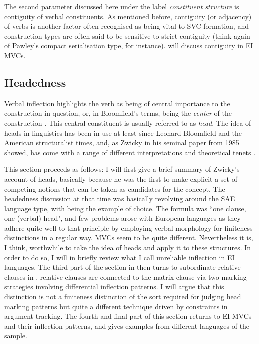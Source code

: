 The second parameter discussed here under the label \textit{constituent structure} is contiguity of verbal constituents. As mentioned before, contiguity (or adjacency) of verbs is another factor often recognised as being vital to SVC formation, and construction types are often said to be sensitive to strict contiguity (think again of Pawley's compact serialisation type, for instance).  will discuss contiguity in EI MVCs.

\subsection{Headedness}\label{sec:headedness}

Verbal inflection highlights the verb as being of central importance to the construction in question, or, in Bloomfield's terms, being the \textit{center} of the construction \citep{bloomfield1933language}. This central constituent is usually referred to as \textit{head}. The idea of heads in linguistics has been in use at least since Leonard Bloomfield and the American structuralist times, and, as Zwicky in his seminal paper from 1985 showed, has come with a range of different interpretations and theoretical tenets \citep{zwicky1985heads1}. 

This section proceeds as follows: I will first give a brief summary of Zwicky's account of heads, basically because he was the first to make explicit a set of competing notions that can be taken as candidates for the concept. The headedness discussion at that time was basically revolving around the \textsc{SAE} language type, with  being the example of choice. The formula was ``one clause, one (verbal) head", and few problems arose with European languages as they adhere quite well to that principle by employing verbal morphology for finiteness distinctions in a regular way. MVCs seem to be quite different. Nevertheless it is, I think, worthwhile to take the idea of heads and apply it to these structures. In order to do so, I will in  briefly review what I call unreliable inflection in EI languages. The third part of the section in  then turns to subordinate relative clauses in .  relative clauses are connected to the matrix clause via two marking strategies involving differential inflection patterns. I will argue that this distinction is not a finiteness distinction of the sort required for judging head marking patterns but quite a different technique driven by constraints in argument tracking. The fourth and final part of this section returns to EI MVCs and their inflection patterns, and gives examples from different languages of the sample.

